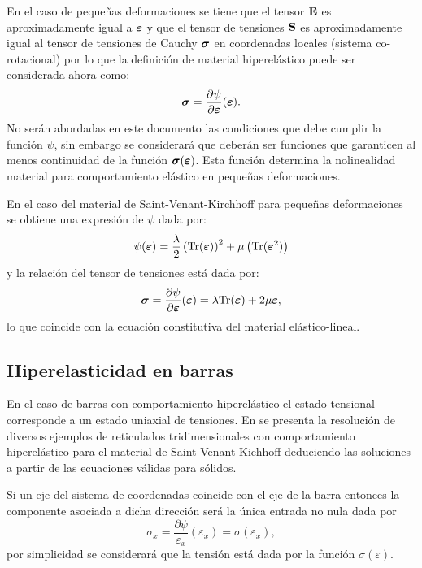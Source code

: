 En el caso de pequeñas deformaciones se tiene que el tensor ${\bf E}$ es aproximadamente igual a $\boldsymbol{\varepsilon}$ y que el tensor de tensiones ${\bf S}$ es aproximadamente igual al tensor de tensiones de Cauchy $\boldsymbol{\sigma}$ en coordenadas locales (sistema co-rotacional) por lo que la definición de material hiperelástico puede ser considerada ahora como:
%
\begin{equation}
  \boldsymbol{\sigma} = \frac{\partial \psi}{\partial \boldsymbol{\varepsilon}} (\boldsymbol{\varepsilon}).
\end{equation}
%
No serán abordadas en este documento las condiciones que debe cumplir la función $\psi$, sin embargo se considerará que deberán ser funciones que garanticen al menos continuidad de la función $\boldsymbol{\sigma}(\boldsymbol{\varepsilon})$. %
%
Esta función determina la nolinealidad material para comportamiento elástico en pequeñas deformaciones.


En el caso del material de Saint-Venant-Kirchhoff para pequeñas deformaciones se obtiene una expresión de $\psi$ dada por:
%
\begin{equation}
\psi(\boldsymbol{\varepsilon}) = \frac{\lambda}{2} \left( \text{Tr}(\boldsymbol{\varepsilon})\right)^2 +  \mu \left(\text{Tr}(\boldsymbol{\varepsilon}^2)\right)
\end{equation}
%
y la relación del tensor de tensiones está dada por:
%
\begin{equation}
\boldsymbol{\sigma} = \frac{\partial \psi}{\partial \boldsymbol{\varepsilon}} (\boldsymbol{\varepsilon}) = \lambda \text{Tr}(\boldsymbol{\varepsilon}) +  2 \mu \boldsymbol{\varepsilon},
\end{equation}
lo que coincide con la ecuación constitutiva del material elástico-lineal. %
%


\subsection{Hiperelasticidad en barras}

En el caso de barras con comportamiento hiperelástico el estado tensional corresponde a un estado uniaxial de tensiones. %
%
En \citep{Castrillo2014} se presenta la resolución de diversos ejemplos de reticulados tridimensionales con comportamiento hiperelástico para el material de Saint-Venant-Kichhoff deduciendo las soluciones a partir de las ecuaciones válidas para sólidos. %
%

Si un eje del sistema de coordenadas coincide con el eje de la barra entonces la componente asociada a dicha dirección será la única entrada no nula dada por
%
\begin{equation}
\sigma_x = \frac{\partial \psi}{\varepsilon_x}(\varepsilon_x) = \sigma (\varepsilon_x),
\end{equation}
%
por simplicidad se considerará que la tensión está dada por la función $\sigma(\varepsilon)$. %



